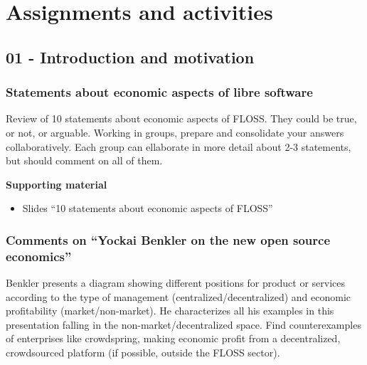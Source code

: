 \documentclass[a4paper]{article}
\begin{document}
\section{Assignments and activities}

\subsection{01 - Introduction and motivation}


\subsubsection{Statements about economic aspects of libre software}
\label{sub:statements-eco}

Review of 10 statements about economic aspects of FLOSS. They could be true, or not, or arguable. Working in groups, prepare and consolidate your answers collaboratively. Each group can ellaborate in more detail about 2-3 statements, but should comment on all of them.

\textbf{Supporting material}

\begin{itemize}
\item Slides ``10 statements about economic aspects of FLOSS''
\end{itemize}

\subsubsection{Comments on ``Yockai Benkler on the new open source economics''}
\label{sub:comments-benkler}

Benkler presents a diagram showing different positions for product or services according to the type of management (centralized/decentralized) and economic profitability (market/non-market). He characterizes all his examples in this presentation falling in the non-market/decentralized space. Find counterexamples of enterprises like crowdspring, making economic profit from a decentralized, crowdsourced platform (if possible, outside the FLOSS sector).
\end{document}
